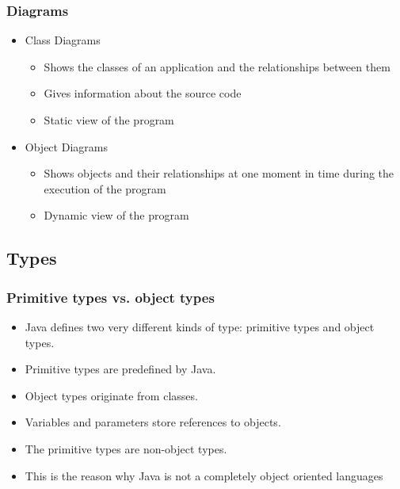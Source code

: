 \begin{frame}
\frametitle{Diagrams}
\begin{itemize}
\item Class Diagrams
\begin{itemize}
\item Shows the classes of an application and the relationships between them
\item Gives information about the source code
\item Static view of the program
\end{itemize}
\item Object Diagrams
\begin{itemize}
\item Shows objects and their relationships at one moment in time during the execution of the program
\item Dynamic view of the program
\end{itemize}
\end{itemize}
\end{frame}



\subsection{Types}
\begin{frame}
\frametitle{Primitive types vs. object types}
\begin{itemize}
\item Java defines two very different kinds of type: primitive types and object types.
\item Primitive types are predefined by Java.
\item Object types originate from classes.
\item Variables and parameters store references to objects.
\item The primitive types are non-object types.
\item This is the reason why Java is not a completely object oriented languages
\end{itemize}
\end{frame}


